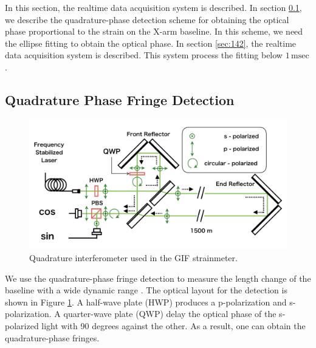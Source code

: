 In this section, the realtime data acquisition system is described.
In section \cref{sec:141}, we describe the quadrature-phase detection scheme for obtaining the optical phase proportional to the strain on the X-arm baseline. In this scheme, we need the ellipse fitting to obtain the optical phase. In section \cref{sec:142}, the realtime data acquisition system is described. This system process the fitting below $1\,\mathrm{msec}$.

\subsection{Quadrature Phase Fringe Detection} \label{sec:141}
\begin{figure}[h]
  \begin{center}
    \includegraphics[width=13.0cm]{./img_chap4/img413.png}
    \caption{Quadrature interferometer used in the GIF strainmeter.}\label{img:img413}
  \end{center}
\end{figure}
We use the quadrature-phase fringe detection to measure the length change of the baseline with a wide dynamic range \cite{bobroff1993recent}. The optical layout for the detection is shown in Figure  \ref{img:img413}. A half-wave plate (HWP) produces a p-polarization and s-polarization. A quarter-wave plate (QWP) delay the optical phase of the s-polarized light with 90 degrees against the other. As a result, one can obtain the quadrature-phase fringes.

